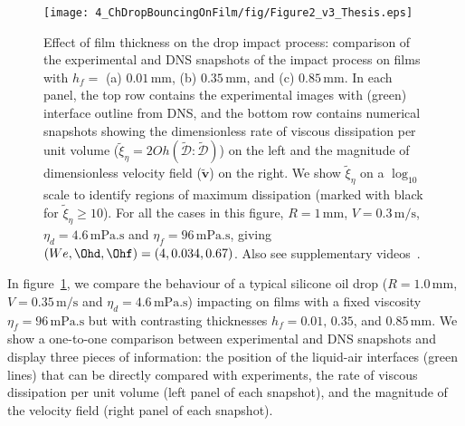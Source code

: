 \begin{figure}
	\centering
	\texttt{[image: 4\_ChDropBouncingOnFilm/fig/Figure2\_v3\_Thesis.eps]}
	\caption{Effect of film thickness on the drop impact process: comparison of the experimental and DNS snapshots of the impact process on films with $h_f = $ (a) $0.01\,\si{\milli\meter}$, (b) $0.35\,\si{\milli\meter}$, and (c) $0.85\,\si{\milli\meter}$. In each panel, the top row contains the experimental images with (green) interface outline from DNS, and the bottom row contains numerical snapshots showing the dimensionless rate of viscous dissipation per unit volume ($\tilde{\xi}_\eta = 2Oh\left(\boldsymbol{\tilde{\mathcal{D}}:\tilde{\mathcal{D}}}\right)$) on the left and the magnitude of dimensionless velocity field ($\boldsymbol{\tilde{v}}$) on the right. We show $\tilde{\xi}_\eta$ on a $\log_{\text{10}}$ scale to identify regions of maximum dissipation (marked with black for $\tilde{\xi}_\eta \ge 10$). For all the cases in this figure, $R = 1\,\si{\milli\meter}$, $V = 0.3\,\si{\meter}/\si{\second}$, $\eta_{d} = 4.6\,\si{\milli\pascal}.\si{\second}$ and $\eta_{f} = 96\,\si{\milli\pascal}.\si{\second}$, giving $(We, \Ohd, \Ohf) = (4, 0.034, 0.67)$. Also see supplementary videos~.}
	\label{fig:figure02}
\end{figure}
% 
In figure~\ref{fig:figure02}, we compare the behaviour of a typical silicone oil drop ($R = 1.0\,\si{\milli\meter}$, $V = 0.35\,\si{\meter}/\si{\second}$ and $\eta_d = 4.6\,\si{\milli\pascal}.\si{\second}$) impacting on films with a fixed viscosity $\eta_f = 96\,\si{\milli\pascal}.\si{\second}$ but with contrasting thicknesses $h_{f} = 0.01,\,0.35$, and $0.85\,\si{\milli\meter}$. We show a one-to-one comparison between experimental and DNS snapshots and display three pieces of information: the position of the liquid-air interfaces (green lines) that can be directly compared with experiments, the rate of viscous dissipation per unit volume (left panel of each snapshot), and the magnitude of the velocity field (right panel of each snapshot).

